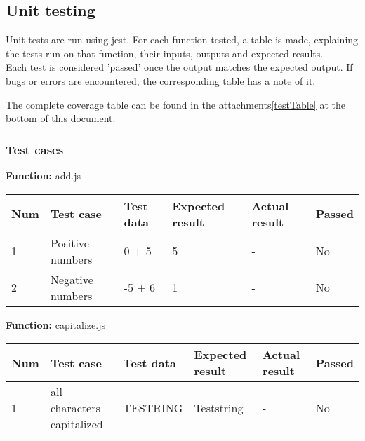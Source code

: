\documentclass[a4paper, 12pt]{article}
\begin{document}
    \subsection{Unit testing}
    Unit tests are run using jest. For each function tested, a table is made, explaining the tests run on that function,
    their inputs, outputs and expected results. 
    \\
    Each test is considered 'passed' once the output matches the expected output. 
    If bugs or errors are encountered, the corresponding table has a note of it.

    The complete coverage table can be found in the attachments\ref{testTable} at the bottom of this document.
    \\

        \subsubsection{Test cases}

        \textbf{Function:} add.js
	
        \begin{table}[h!]
            \begin{tabular}{|l|l|l|l|l|l|}
                \hline
                Num & Test case        					& Test data 					& Expected result 					& Actual result 		& Passed \\ \hline
                1   & Positive numbers 					& 0 + 5     					& 5               					& -             		& No     \\ \hline
                2   & Negative numbers 					& -5 + 6    					& 1               					& -             		& No     \\ \hline
            \end{tabular}
        \end{table}
    
        \textbf{Function:} capitalize.js
    
        \begin{table}[h!]
            \begin{tabular}{|l|p{3cm}|p{2cm}|p{2cm}|p{2.5cm}|l|}
                \hline
                Num & Test case        					& Test data 					& Expected result 					& Actual result 		& Passed \\ \hline
                1   & all characters capitalized 		& TESTRING     					& Teststring            			& -             		& No     \\ \hline
            \end{tabular}
        \end{table}
    
\end{document}
